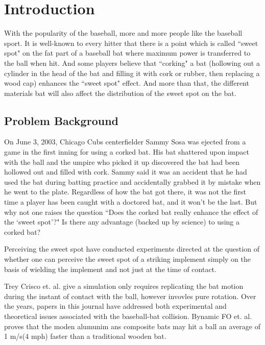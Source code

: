 \section{Introduction}

With the popularity of the baseball, more and more people like the baseball sport. It is well-known to every hitter that there is a point which is called ``sweet spot" on the fat part of a baseball bat where maximum power is transferred to the ball when hit. And some players believe that ``corking" a bat (hollowing out a cylinder in the head of the bat and filling it with cork or rubber, then replacing a wood cap) enhances the ``sweet spot" effect. And more than that, the different materials bat will also affect the distribution of the sweet spot on the bat.

\subsection{Problem  Background}

On June 3, 2003, Chicago Cubs centerfielder Sammy Sosa was ejected from a game in the first inning for using a corked bat. His bat shattered upon impact with the ball and the umpire who picked it up discovered the bat had been hollowed out and filled with cork. Sammy said it was an accident that he had used the bat during batting practice and accidentally grabbed it by mistake when he went to the plate. Regardless of how the bat got there, it was not the first time a player has been caught with a doctored bat, and it won't be the last. But why not one raises the question ``Does the corked bat really enhance the effect of the `sweet spot'?" Is there any advantage (backed up by science) to using a corked bat?

Perceiving the sweet spot have conducted experiments directed at the question of whether one can perceive the sweet spot of a striking implement simply on the basis of wielding the implement and not just at the time of contact\cite{sweetspot}.

Trey Crisco et. al.\cite{DynamicPerformance} give a simulation only requires replicating the bat motion during the instant of contact with the ball, however invovles pure rotation.
Over the years, papers in this journal have addressed both experimental and theoretical issues associated with the baseball-bat collision. Bynamic FO et. al.\cite{PersonalCommunication} proves that the moden alumunim ans composite bats may hit a ball an average of 1 m/s(4 mph) faster than a traditional wooden bat.


